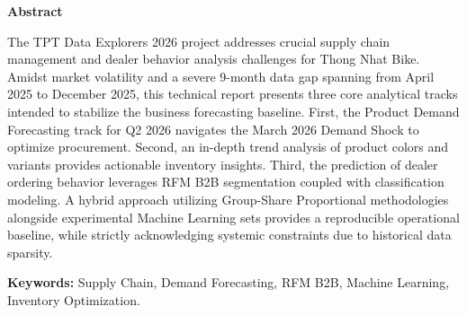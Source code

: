 \begin{center}
\textbf{Abstract}
\end{center}

The TPT Data Explorers 2026 project addresses crucial supply chain management and dealer behavior analysis challenges for Thong Nhat Bike. Amidst market volatility and a severe 9-month data gap spanning from April 2025 to December 2025, this technical report presents three core analytical tracks intended to stabilize the business forecasting baseline. First, the Product Demand Forecasting track for Q2 2026 navigates the March 2026 Demand Shock to optimize procurement. Second, an in-depth trend analysis of product colors and variants provides actionable inventory insights. Third, the prediction of dealer ordering behavior leverages RFM B2B segmentation coupled with classification modeling. A hybrid approach utilizing Group-Share Proportional methodologies alongside experimental Machine Learning sets provides a reproducible operational baseline, while strictly acknowledging systemic constraints due to historical data sparsity.

\vspace{0.5in}
\noindent \textbf{Keywords:} Supply Chain, Demand Forecasting, RFM B2B, Machine Learning, Inventory Optimization.
\FloatBarrier
